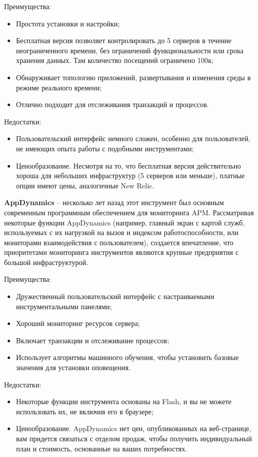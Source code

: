 Преимущества:
\begin{itemize}
	\item Простота установки и настройки;
	\item Бесплатная версия позволяет контролировать до 5 серверов в течение неограниченного времени, без ограничений функциональности или срока хранения данных. Там количество посещений ограничено 100к;
	\item Обнаруживает топологию приложений, развертывания и изменения среды в режиме реального времени;
	\item Отлично подходит для отслеживания транзакций и процессов.
\end{itemize}

Недостатки: 
\begin{itemize}
	\item Пользовательский интерфейс немного сложен, особенно для пользователей, не имеющих опыта работы с подобными инструментами;
	\item Ценообразование. Несмотря на то, что бесплатная версия действительно хороша для небольших инфраструктур (5 серверов или меньше), платные опции имеют цены, аналогичные New Relic.
\end{itemize}


\textbf{AppDynamics} – несколько лет назад этот инструмент был основным современным программным обеспечением для мониторинга APM. Рассматривая некоторые функции AppDynamics (например, главный экран с картой служб, используемых с их нагрузкой на вызов и индексом работоспособности, или мониторами взаимодействия с пользователем), создается впечатление, что приоритетами мониторинга инструментов являются крупные предприятия с большой инфраструктурой.\cite{Theworld87:online}

Преимущества:
\begin{itemize}
	\item Дружественный пользовательский интерфейс с настраиваемыми инструментальными панелями;
	\item Хороший мониторинг ресурсов сервера;
	\item Включает транзакции и отслеживание процессов;
	\item Использует алгоритмы машинного обучения, чтобы установить базовые значения для установки оповещения.
\end{itemize}

Недостатки:
\begin{itemize}
	\item Некоторые функции инструмента основаны на Flash, и вы не можете использовать их, не включив его в браузере;
	\item Ценообразование. AppDynamics нет цен, опубликованных на веб-странице, вам придется связаться с отделом продаж, чтобы получить индивидуальный план и стоимость, основанные на ваших потребностях.
\end{itemize}


